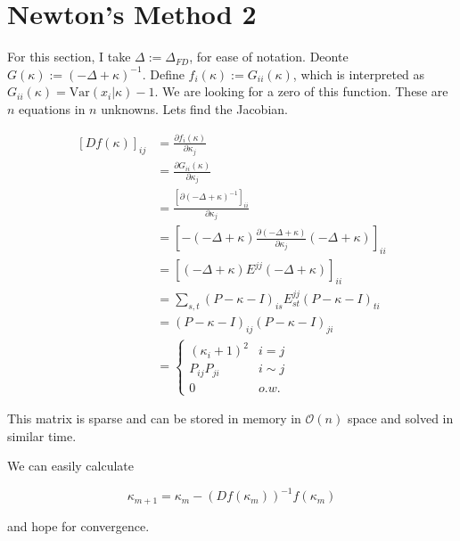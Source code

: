 \documentclass[paper=a4, fontsize=11pt]{scrartcl} %
\numberwithin{equation}{section} %
\numberwithin{figure}{section} %
\numberwithin{table}{section} %
\newcommand{\var}{\text{Var}}
\begin{document}
\section{Newton's Method 2}
For this section, I take $\Delta :=\Delta_{FD}$, for 
ease of notation. Deonte $G(\kappa):= (-\Delta + \kappa )^{-1}$. 
Define $f_{i}(\kappa) :=G_{ii}(\kappa)$, which is interpreted
as $G_{ii}(\kappa) = \var( x_i | \kappa) -1$. We 
are looking for a zero of this function. These are $n$ equations
in $n$ unknowns. Lets find the Jacobian.

\begin{align*}
  [Df(\kappa)]_{ij} &= \frac{ \partial f_{i}(\kappa)}{\partial \kappa_j} \\
  &= \frac{ \partial G_{ii}(\kappa)}{\partial \kappa_j} \\
  &= \frac{ [\partial (-\Delta + \kappa)^{-1}]_{ii}}{\partial \kappa_j} \\
  &= [-(-\Delta +\kappa )\frac{ \partial (-\Delta + \kappa)}{\partial \kappa_j}(-\Delta+ \kappa )]_{ii} \\
  &= [(-\Delta  + \kappa)E^{jj}(-\Delta + \kappa)]_{ii} \\
  &= \sum_{s,t} (P-\kappa - I)_{is}E^{jj}_{st}(P- \kappa - I)_{ti} \\
  &= (P-\kappa - I)_{ij}(P- \kappa - I)_{ji} \\
  &=
    \begin{cases}
      (\kappa_i + 1)^2 & i = j\\
      P_{ij}P_{ji} & i \sim j \\
      0 & o.w.
    \end{cases} 
\end{align*}

This matrix is sparse and can be stored in memory in $\mathcal{O}(n)$ space and solved 
in similar time.

 We can easily calculate 

$$
\kappa_{m+1} = \kappa_{m} - (Df(\kappa_{m}))^{-1} f(\kappa_{m})
$$

and hope for convergence.



\end{document}
